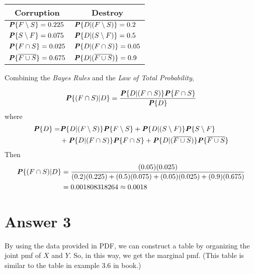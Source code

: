 \documentclass[12pt]{article}
\newcommand{\prob}[1]{\textbf{\textit{P}}\{#1\}}
\begin{document}
\begin{table}[h!]
    \centering
    \begin{tabular}{l|l}
    \multicolumn{1}{c|}{Corruption}      & \multicolumn{1}{c}{Destroy}               \\ 
    \hline
    $\prob{F \setminus S}       = 0.225$ & $\prob{D | (F \setminus S)}       = 0.2$  \\
    $\prob{S \setminus F}       = 0.075$ & $\prob{D | (S \setminus F)}       = 0.5$  \\
    $\prob{F \cap S}            = 0.025$ & $\prob{D | (F \cap S)}            = 0.05$ \\
    $\prob{\overline{F \cup S}} = 0.675$ & $\prob{D | (\overline{F \cup S})} = 0.9$        
    \end{tabular}
\end{table}

Combining the \textit{Bayes Rules} and the \textit{Law of Total Probability},

\begin{equation*}
    \prob{(F \cap S) | D} = \frac{\prob{D | (F \cap S)} \prob{F \cap S}}{\prob{D}}
\end{equation*}
where
\begin{align*}
    \prob{D} = &\prob{D | (F \setminus S)} \prob{F \setminus S} + \prob{D | (S \setminus F)} \prob{S \setminus F}\\
    &+ \prob{D | (F \cap S)} \prob{F \cap S} + \prob{D | (\overline{F \cup S})} \prob{\overline{F \cup S}}
\end{align*}
Then
\begin{align*}
    \prob{(F \cap S) | D} &= \frac{(0.05)(0.025)}{(0.2)(0.225) + (0.5)(0.075) + (0.05)(0.025) + (0.9)(0.675)}\\
    &= 0.001808318264 \approx 0.0018
\end{align*}


\section*{Answer 3}

By using the data provided in PDF, we can construct a table by organizing the joint pmf of $X$ and $Y$. So, in this way, we get the marginal pmf. (This table is similar to the table in example 3.6 in book.)
\end{document}
